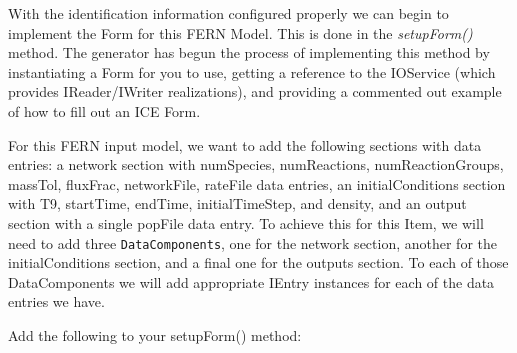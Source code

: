 With the identification information configured properly we can begin to
implement the Form for this FERN Model. This is done in the \emph{setupForm()}
method.
The generator has begun the process of implementing this method by instantiating
a Form for you to use, getting a reference to the IOService (which provides
IReader/IWriter realizations), and providing a commented out example of how to
fill out an ICE Form.

For this FERN input model, we want to add the following sections with data
entries: a network section with 
numSpecies, numReactions, numReactionGroups, massTol, fluxFrac, networkFile,
rateFile data entries, an initialConditions section with T9, startTime, endTime,
initialTimeStep, and density, and an output section with a single popFile
data entry.
To achieve this for this Item, we will need to add three
\texttt{DataComponents}, one for the network section, another for the
initialConditions section, and a final one for the outputs section. To each of
those DataComponents we will add appropriate IEntry instances for each of the data entries we have.

Add the following to your setupForm() method: 

